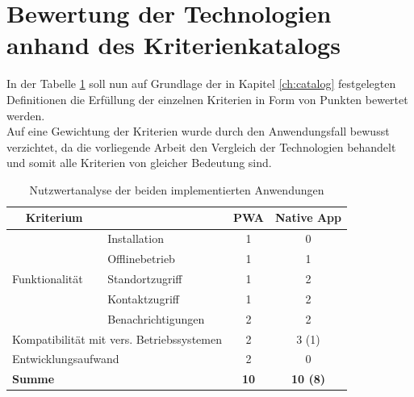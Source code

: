 \section{Bewertung der Technologien anhand des Kriterienkatalogs}
In der Tabelle \ref{fig:discussion_impl} soll nun auf Grundlage der in Kapitel \ref{ch:catalog} festgelegten Definitionen die Erfüllung der einzelnen Kriterien in Form von Punkten bewertet werden.\\
Auf eine Gewichtung der Kriterien wurde durch den Anwendungsfall bewusst verzichtet, da die vorliegende Arbeit den Vergleich der Technologien behandelt und somit alle Kriterien von gleicher Bedeutung sind.

\begin{table}[ht]
\centering
\caption{Nutzwertanalyse der beiden implementierten Anwendungen}
\begin{tabular}{|ll|c|c|}
\hline
\multicolumn{1}{|c}{\textbf{Kriterium}}               & \multicolumn{1}{c|}{} & \textbf{PWA} & \textbf{Native App} \\ \hline
\multicolumn{1}{|l|}{\multirow{5}{*}{Funktionalität}} & Installation          & 1            & 0                   \\ \cline{2-4} 
\multicolumn{1}{|l|}{}                                & Offlinebetrieb        & 1            & 1                   \\ \cline{2-4} 
\multicolumn{1}{|l|}{}                                & Standortzugriff       & 1            & 2                   \\ \cline{2-4} 
\multicolumn{1}{|l|}{}                                & Kontaktzugriff        & 1            & 2                   \\ \cline{2-4} 
\multicolumn{1}{|l|}{}                                & Benachrichtigungen    & 2            & 2                   \\ \hline
\multicolumn{2}{|l|}{Kompatibilität mit vers. Betriebssystemen}               & 2            & 3 (1)               \\ \hline
\multicolumn{2}{|l|}{Entwicklungsaufwand}                                     & 2            & 0                   \\ \hline
\multicolumn{2}{|l|}{\textbf{Summe}}                                          & \textbf{10}  & \textbf{10 (8)}     \\ \hline
\end{tabular}
\label{fig:discussion_impl}
\end{table}

